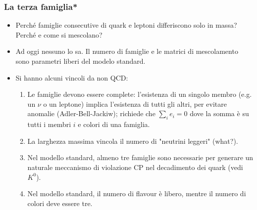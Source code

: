 \subsubsection{La terza famiglia*}
\begin{itemize}
    \item Perché famiglie consecutive di quark e leptoni differiscono solo in massa? Perché e come si mescolano? 
    \item Ad oggi nessuno lo sa. Il numero di famiglie e le matrici di mescolamento sono parametri liberi del modelo standard.
    \item Si hanno alcuni vincoli da non QCD:
    \begin{enumerate}
    \item Le famiglie devono essere complete: l'esistenza di un singolo membro (e.g. un $\nu$ o un leptone) implica l'esistenza di tutti gli altri, per evitare anomalie (Adler-Bell-Jackiw); richiede che $\sum_ie_i=0$ dove la somma è su tutti i membri $i$ e colori di una famiglia. 
    \item La larghezza massima vincola il numero di "neutrini leggeri" (what?).
    \item Nel modello standard, almeno tre famiglie sono necessarie per generare un naturale meccanismo di violazione CP nel decadimento dei quark (vedi $K^0$).
    \item Nel modello standard, il numero di flavour è libero, mentre il numero di colori deve essere tre.
    \end{enumerate}
\end{itemize}
